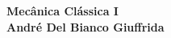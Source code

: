\documentclass[a4paper,12pt]{exam}
\begin{document}
\begingroup 
	  \bf \Large Mecânica Clássica I\\
	  \indent \normalsize André Del Bianco Giuffrida
	\endgroup
	\\ \quad
	\\
	\begin{figure}[h]
			\centering
		\end{figure}

		
	
\end{document}

